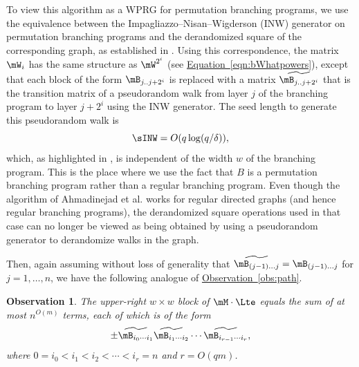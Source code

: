 \documentclass[11pt]{article}
\newcommand{\expref}[2]{\texorpdfstring{\hyperref[#2]{#1~\ref{#2}}}{#1~\ref{#2}}}
\newcommand{\expeqref}[2]{\texorpdfstring{\hyperref[#2]{#1~\eqref{#2}}}{#1~\eqref{#2}}}
\newtheorem{observation}[theorem]{Observation}
\begin{document}
    To view this algorithm as a WPRG for permutation branching programs, we use
    the equivalence between the Impagliazzo--Nisan--Wigderson (INW) generator on permutation branching programs and the derandomized square of the corresponding graph, as established in \cite{RozenmanVa05,HozaPyVa21}.
    Using this correspondence, the matrix $\mW_i$ has the same structure as $\mW^{2^i}$ (see \expeqref{Equation}{eqn:bWhatpowers}), except that each block of the form $\mB_{j..j+2^i}$ is replaced with a matrix $\widetilde{\mB_{j..j+2^i}}$ that is the transition matrix of a pseudorandom
    walk from layer $j$ of the branching program to layer $j+2^i$ using the INW generator.  
    The seed length to generate this pseudorandom walk is
    $$\sINW = O(q\log(q/\delta)),$$
    which, as highlighted in \cite{HozaPyVa21}, is independent of the width $w$ of the branching program.
    This is the place where we use the fact that $B$ is a permutation branching program rather than a regular branching program.  Even though the algorithm of Ahmadinejad et al. works for regular directed graphs (and hence regular branching programs), the derandomized square operations used in that case can no longer be viewed as being obtained by using a pseudorandom generator to derandomize walks in the graph.
    
    Then, again assuming without loss of generality that 
    $\widetilde{\mB_{(j-1)\ldots j}}=\mB_{(j-1)\ldots j}$ for $j=1,\ldots,n$, we have
    the following analogue of \expref{Observation}{obs:path}. %
    \begin{observation} \label{obs:cycle}
    The upper-right $w\times w$ block of $\mM \cdot \Lte$ equals the sum of at most $n^{O(m)}$ terms, each of which is of the form 
    \begin{equation} \label{eqn:permutation-terms}
    \pm \widetilde{\mB_{i_0\cdots i_1}}
    \widetilde{\mB_{i_1\cdots i_2}}
    \cdots
    \widetilde{\mB_{i_{r-1}\cdots i_r}},
    \end{equation}
    where $0=i_0<i_1<i_2<\cdots<i_r=n$ and $r=O(qm)$.
    \end{observation}
    
\end{document}
